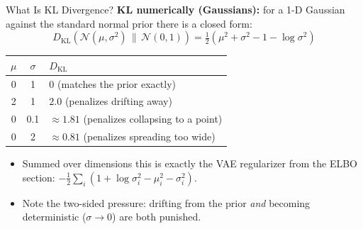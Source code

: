 \begin{frame}[allowframebreaks]{What Is KL Divergence?}
\textbf{KL numerically (Gaussians):} for a 1-D Gaussian against the standard normal prior there is a closed form:
\[
D_{\mathrm{KL}}\!\left( \mathcal{N}(\mu, \sigma^2) \,\|\, \mathcal{N}(0, 1) \right) = \tfrac{1}{2}\left( \mu^2 + \sigma^2 - 1 - \log \sigma^2 \right)
\]
\begin{center}
\small
\renewcommand{\arraystretch}{1.15}
\begin{tabular}{@{}ccl@{}}
\hline
$\mu$ & $\sigma$ & $D_{\mathrm{KL}}$ \\
\hline
0 & 1 & $0$ \hfill (matches the prior exactly) \\
2 & 1 & $2.0$ \hfill (penalizes drifting away) \\
0 & 0.1 & $\approx 1.81$ \hfill (penalizes collapsing to a point) \\
0 & 2 & $\approx 0.81$ \hfill (penalizes spreading too wide) \\
\hline
\end{tabular}
\end{center}
\vspace{0.3em}
\begin{itemize}
    \item Summed over dimensions this is exactly the VAE regularizer from the ELBO section: $-\tfrac{1}{2} \sum_i \left( 1 + \log \sigma_i^2 - \mu_i^2 - \sigma_i^2 \right)$.
    \item Note the two-sided pressure: drifting from the prior \emph{and} becoming deterministic ($\sigma \to 0$) are both punished.
\end{itemize}
\end{frame}
